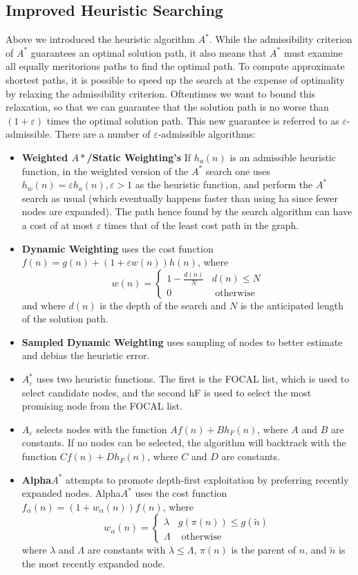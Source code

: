 \documentclass[11pt]{article}
\begin{document}
\subsection{Improved Heuristic Searching}
Above we introduced the heuristic algorithm $A^*$. While the admissibility criterion of $A^*$ guarantees an optimal solution path, it also means that $A^*$ must examine all equally meritorious paths to find the optimal path. To compute approximate shortest paths, it is possible to speed up the search at the expense of optimality by relaxing the admissibility criterion. Oftentimes we want to bound this relaxation, so that we can guarantee that the solution path is no worse than $(1 + \varepsilon)$ times the optimal solution path. This new guarantee is referred to as $\varepsilon$-admissible.
There are a number of $\varepsilon$-admissible algorithms:
\begin{itemize}
	\item \textbf{Weighted $A*$/Static Weighting's}\cite{ref7} If $h_a(n)$ is an admissible heuristic function, in the weighted version of the $A^*$ search one uses $h_w(n) = \varepsilon h_a(n), \varepsilon > 1$ as the heuristic function, and perform the $A^*$ search as usual (which eventually happens faster than using ha since fewer nodes are expanded). The path hence found by the search algorithm can have a cost of at most $\varepsilon$ times that of the least cost path in the graph.\cite{ref8}
	\item \textbf{Dynamic Weighting}\cite{ref9} uses the cost function $f(n)=g(n)+(1+\varepsilon w(n)) h(n)$, where $$w(n)= \begin{cases}1-\frac{d(n)}{N} & d(n) \leq N \\ 0 & \text { otherwise }\end{cases}$$ 
	and where $d(n)$ is the depth of the search and $N$ is the anticipated length of the solution path.
	\item \textbf{Sampled Dynamic Weighting}\cite{ref10} uses sampling of nodes to better estimate and debias the heuristic error.
	\item $A_{\varepsilon}^{*}$\cite{ref11} uses two heuristic functions. The first is the FOCAL list, which is used to select candidate nodes, and the second hF is used to select the most promising node from the FOCAL list.
	\item $A_{\varepsilon}$\cite{ref12} selects nodes with the function $A f(n)+B h_{F}(n)$, where $A$ and $B$ are constants. If no nodes can be selected, the algorithm will backtrack with the function $C f(n)+D h_{F}(n)$, where $C$ and $D$ are constants.
	\item \textbf{Alpha$A^*$}\cite{ref13} attempts to promote depth-first exploitation by preferring recently expanded nodes. Alpha$A^*$ uses the cost function $f_{\alpha}(n)=\left(1+w_{\alpha}(n)\right) f(n)$, where 
	$$
	w_{\alpha}(n)= \begin{cases}\lambda & g(\pi(n)) \leq g(\tilde{n}) \\ \Lambda & \text { otherwise }\end{cases}
	$$
	where $\lambda$ and $\Lambda$ are constants with $\lambda \leq \Lambda$, $\pi(n)$ is the parent of $n$, and $\tilde{n}$ is the most recently expanded node.  
\end{itemize}
\end{document}
